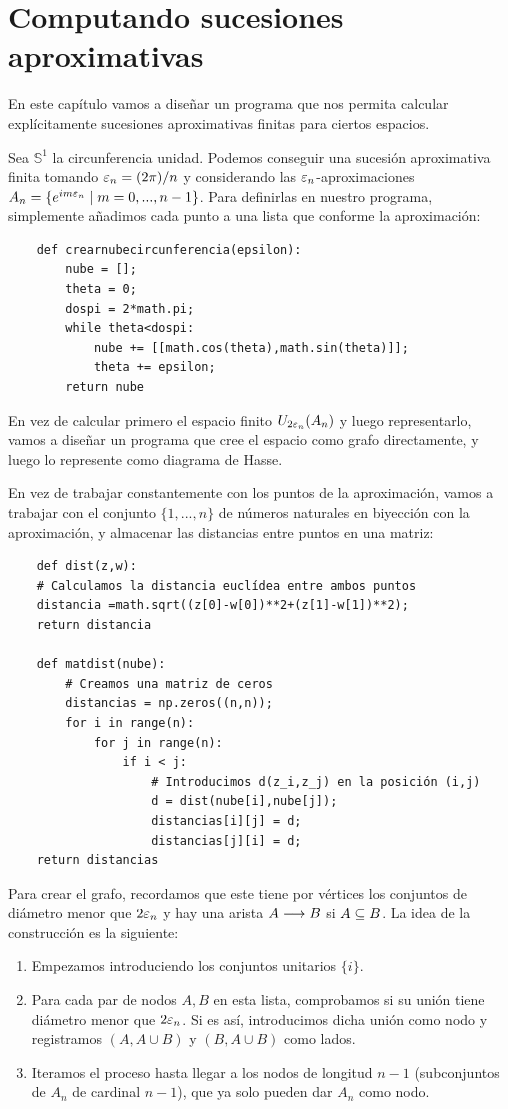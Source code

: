 \chapter{Computando sucesiones aproximativas}
En este capítulo vamos a dise\~nar un programa que nos permita calcular explícitamente sucesiones aproximativas finitas para ciertos espacios. 

Sea $ \mathbb{S}^1  $ la circunferencia unidad. Podemos conseguir una sucesión aproximativa finita tomando $ \varepsilon_n = (2\pi )/n$ y considerando las $ \varepsilon_n  $-aproximaciones $ A_n = \{e^{im \varepsilon_n }\mid m =0,...,n-1\} $. Para definirlas en nuestro programa, simplemente a\~nadimos cada punto a una lista que conforme la aproximación: 

\begin{verbatim}
    def crearnubecircunferencia(epsilon):
        nube = [];
        theta = 0;
        dospi = 2*math.pi;
        while theta<dospi:
            nube += [[math.cos(theta),math.sin(theta)]];
            theta += epsilon;
        return nube
\end{verbatim}

En vez de calcular primero el espacio finito $ U_{2\varepsilon_n}(A_n) $ y luego representarlo, vamos a dise\~nar un programa que cree el espacio como grafo directamente, y luego lo represente como diagrama de Hasse. 

En vez de trabajar constantemente con los puntos de la aproximación, vamos a trabajar con el conjunto $ \{1,...,n\} $ de números naturales en biyección con la aproximación, y almacenar las distancias entre puntos en una matriz:
\begin{verbatim}
    def dist(z,w):
    # Calculamos la distancia euclídea entre ambos puntos
    distancia =math.sqrt((z[0]-w[0])**2+(z[1]-w[1])**2);
    return distancia

    def matdist(nube):
        # Creamos una matriz de ceros
        distancias = np.zeros((n,n));
        for i in range(n):
            for j in range(n):
                if i < j:
                    # Introducimos d(z_i,z_j) en la posición (i,j)
                    d = dist(nube[i],nube[j]);
                    distancias[i][j] = d;
                    distancias[j][i] = d;
    return distancias
\end{verbatim}

Para crear el grafo, recordamos que este tiene por vértices los conjuntos de diámetro menor que $ 2\varepsilon_n  $ y hay una arista $ A\longrightarrow B  $ si $ A\subseteq B  $. La idea de la construcción es la siguiente:
\begin{enumerate}
    \item Empezamos introduciendo los conjuntos unitarios $ \{i\} $.
    \item Para cada par de nodos $ A,B  $ en esta lista, comprobamos si su unión tiene diámetro menor que $ 2\varepsilon_n  $. Si es así, introducimos dicha unión como nodo y registramos $ (A,A\cup B ) $ y $ (B,A\cup B ) $ como lados.
    \item Iteramos el proceso hasta llegar a los nodos de longitud $ n-1 $ (subconjuntos de $ A_n  $ de cardinal $ n-1  $), que ya solo pueden dar $ A_n  $ como nodo.

\end{enumerate}

